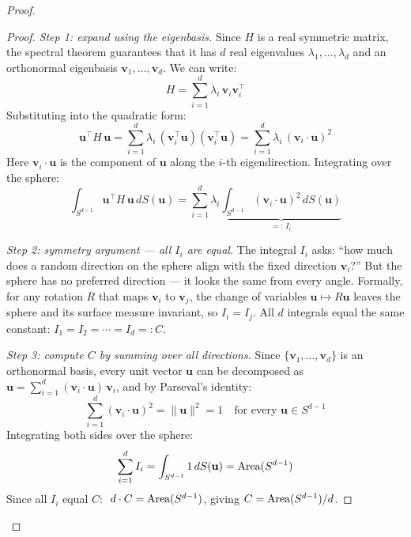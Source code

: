 \begin{notechapter}
\begin{proof}
\begin{proof}
\emph{Step 1: expand using the eigenbasis.} Since $H$ is a real symmetric
matrix, the spectral theorem guarantees that it has $d$ real eigenvalues
$\lambda_1, \ldots, \lambda_d$ and an orthonormal eigenbasis
$\mathbf{v}_1, \ldots, \mathbf{v}_d$. We can write:
\[
H = \sum_{i=1}^d \lambda_i\,\mathbf{v}_i\mathbf{v}_i^\top
\]
Substituting into the quadratic form:
\[
\mathbf{u}^\top H\,\mathbf{u}
= \sum_{i=1}^d \lambda_i\,
  (\mathbf{v}_i^\top\mathbf{u})(\mathbf{v}_i^\top\mathbf{u})
= \sum_{i=1}^d \lambda_i\,(\mathbf{v}_i \cdot \mathbf{u})^2
\]
Here $\mathbf{v}_i \cdot \mathbf{u}$ is the component of $\mathbf{u}$ along
the $i$-th eigendirection. Integrating over the sphere:
\begin{equation}
\label{harmonic-functions:eq:quadratic_expansion}
\int_{S^{d-1}} \mathbf{u}^\top H\,\mathbf{u}\,dS(\mathbf{u})
= \sum_{i=1}^d \lambda_i
  \underbrace{\int_{S^{d-1}}(\mathbf{v}_i \cdot \mathbf{u})^2\,
  dS(\mathbf{u})}_{=:\, I_i}
\end{equation}

\emph{Step 2: symmetry argument --- all $I_i$ are equal.} The integral $I_i$
asks: ``how much does a random direction on the sphere align with the fixed
direction $\mathbf{v}_i$?'' But the sphere has no preferred direction --- it
looks the same from every angle. Formally, for any rotation $R$ that maps
$\mathbf{v}_i$ to $\mathbf{v}_j$, the change of variables
$\mathbf{u} \mapsto R\mathbf{u}$ leaves the sphere and its surface measure
invariant, so $I_i = I_j$. All $d$ integrals equal the same constant:
$I_1 = I_2 = \cdots = I_d =: C$.

\emph{Step 3: compute $C$ by summing over all directions.} Since
$\{\mathbf{v}_1, \ldots, \mathbf{v}_d\}$ is an orthonormal basis, every
unit vector $\mathbf{u}$ can be decomposed as
$\mathbf{u} = \sum_{i=1}^d (\mathbf{v}_i \cdot \mathbf{u})\,\mathbf{v}_i$,
and by Parseval's identity:
\[
\sum_{i=1}^d (\mathbf{v}_i \cdot \mathbf{u})^2 = \|\mathbf{u}\|^2 = 1
\quad\text{for every } \mathbf{u} \in S^{d-1}
\]
Integrating both sides over the sphere:
\[
\sum_{i=1}^d I_i = \int_{S^{d-1}} 1\,dS(\mathbf{u}) = \operatorname{Area}(S^{d-1})
\]
Since all $I_i$ equal $C$: $\;d \cdot C = \operatorname{Area}(S^{d-1})$, giving
$C = \operatorname{Area}(S^{d-1})/d$.


\end{proof}
\end{proof}
\end{notechapter}
